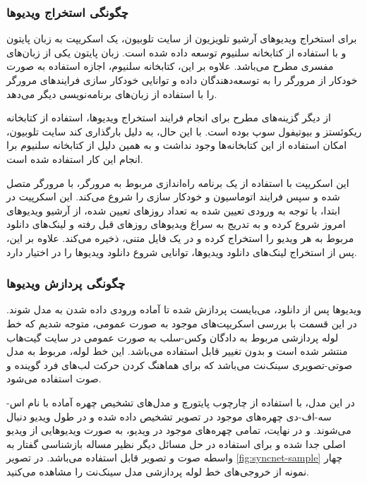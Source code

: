 \subsubsection{چگونگی استخراج ویدیو‌ها}

برای استخراج ویدیو‌های آرشیو تلویزیون از سایت تلوبیون، یک اسکریپت به زبان پایتون
و با استفاده از کتابخانه سلنیوم
توسعه داده شده است. زبان پایتون یکی از زبان‌های مفسری
مطرح می‌باشد. علاوه بر این، کتابخانه سلنیوم، اجازه استفاده به صورت خودکار از مرورگر را به توسعه‌دهندگان داده و توانایی خودکار سازی فرایند‌های مرورگر را با استفاده از زبان‌های برنامه‌نویسی دیگر می‌دهد.

از دیگر گزینه‌های مطرح برای انجام فرایند استخراج ویدیو‌ها، استفاده از کتابخانه ریکوئستز
و بیوتیفول سوپ
بوده است. با این حال، به دلیل بارگذاری کند
سایت تلوبیون، امکان استفاده از این کتابخانه‌ها وجود نداشت و به همین دلیل از کتابخانه سلنیوم برا انجام این کار استفاده شده است.

این اسکریپت با استفاده از یک برنامه راه‌اندازی
مربوط به مرورگر، با مرورگر متصل شده و سپس فرایند اتوماسیون و خودکار سازی را شروع می‌کند. این اسکرپیت در ابتدا، با توجه به ورودی تعیین شده به تعداد روز‌های تعیین شده، از آرشیو ویدیو‌های امروز شروع کرده و به تدریج به سراغ ویدیو‌های روز‌های قبل رفته و لینک‌های دانلود مربوط به هر ویدیو را استخراج کرده و در یک فایل متنی، ذخیره می‌کند. علاوه بر این، پس از استخراج لینک‌های دانلود ویدیو‌ها، توانایی شروع دانلود ویدیو‌ها را در اختیار دارد.

\subsubsection{چگونگی پردازش ویدیو‌ها}

ویدیو‌ها پس از دانلود، می‌بایست پردازش شده تا آماده ورودی داده شدن به مدل شوند. در این قسمت با بررسی اسکریپت‌های موجود به صورت عمومی، متوجه شدیم که خط لوله
پردازشی مربوط به دادگان وکس-سلب به صورت عمومی در سایت گیت‌هاب منتشر شده است و بدون تغییر قابل استفاده می‌باشد. این خط لوله، مربوط به مدل صوتی-تصویری سینک‌نت
می‌باشد که برای هماهنگ کردن حرکت لب‌های فرد گوینده و صوت استفاده می‌شود.

در این مدل، با استفاده از چارچوب پایتورچ و مدل‌های تشخیص چهره آماده با نام اس-سه-اف-دی
چهره‌های موجود در تصویر تشخیص داده شده و در طول ویدیو دنبال می‌شوند. و در نهایت، تمامی چهره‌های موجود در ویدیو، به صورت ویدیو‌هایی از ویدیو اصلی جدا شده و برای استفاده در حل مسائل دیگر نظیر مساله بازشناسی گفتار به واسطه صوت و تصویر قابل استفاده می‌باشد. در تصویر 
\ref{fig:syncnet-sample}
چهار نمونه از خروجی‌های خط لوله پردازشی مدل سینک‌نت را مشاهده می‌کنید.


